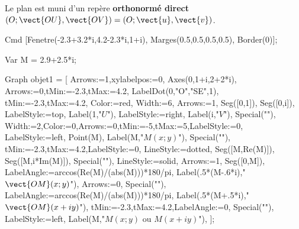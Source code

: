 \documentclass[a4paper,12pt]{article}
\renewcommand{\notep}[1]{}
\begin{document}
\begin{frame}[fragile]

Le plan est muni d'un rep\`ere \alert{\bf orthonorm\'e direct} 
$(O ; \vect{OU} , \vect{OV})=(O;\vect{u},\vect{v})$.


\begin{texgraph}
Cmd	[Fenetre(-2.3+3.2*i,4.2-2.3*i,1+i), Marges(0.5,0.5,0.5,0.5), Border(0)];

Var
    M = 2.9+2.5*i;

Graph objet1 = [
	Arrows:=1,xylabelpos:=0,
	Axes(0,1+i,2+2*i),
	Arrows:=0,tMin:=-2.3,tMax:=4.2,
	LabelDot(0,"O","SE",1),
	tMin:=-2.3,tMax:=4.2,
	Color:=red,
	Width:=6,
	Arrows:=1,
	Seg([0,1]),
	Seg([0,i]),
	LabelStyle:=top,
	Label(1,"$U$"),
	LabelStyle:=right,
	Label(i,"$V$"),
	Special("\pause"),
	Width:=2,Color:=0,Arrows:=0,tMin:=-5,tMax:=5,LabelStyle:=0,
	LabelStyle:=left,
	Point(M),
	Label(M,"$M(x;y)$"),
	Special("\pause"),
	tMin:=-2.3,tMax:=4.2,LabelStyle:=0,
	LineStyle:=dotted,
	Seg([M,Re(M)]),
	Seg([M,i*Im(M)]),
	Special("\pause"),
	LineStyle:=solid,
	Arrows:=1,
	Seg([0,M]),
	LabelAngle:=arccos(Re(M)/(abs(M)))*180/pi,
	Label(.5*(M-.6*i),"$\vect{OM}(x;y)$"),
	Arrows:=0,
	Special("\pause"),
	LabelAngle:=arccos(Re(M)/(abs(M)))*180/pi,
	Label(.5*(M+.5*i),"$\vect{OM}(x+iy)$"),
	tMin:=-2.3,tMax:=4.2,LabelAngle:=0,
	Special("\pause"),
	LabelStyle:=left,
	Label(M,"$M(x;y)$ ou $M(x+iy)$"),
];
\end{texgraph}




\end{frame}




\notep{bien faire le dessin progressif: on ne peut pas représenter sur un axe ...}
\end{document}
